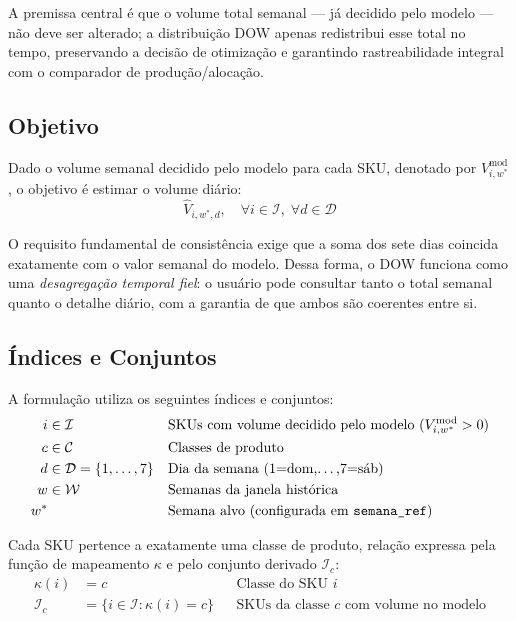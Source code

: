 \documentclass[11pt,a4paper]{article}
\begin{document}
A premissa central é que o volume total semanal --- já decidido pelo modelo ---
não deve ser alterado; a distribuição DOW apenas redistribui esse total no tempo,
preservando a decisão de otimização e garantindo rastreabilidade integral com o
comparador de produção/alocação.

\subsection{Objetivo}

Dado o volume semanal decidido pelo modelo para cada SKU, denotado por
$V^{\text{mod}}_{i,w^*}$, o objetivo é estimar o volume diário:
\begin{equation}\label{eq:dow:objetivo}
\hat{V}_{i,w^*,d}, \quad \forall i \in \mathcal{I},\;\forall d \in \mathcal{D}
\end{equation}

O requisito fundamental de consistência exige que a soma dos sete dias coincida
exatamente com o valor semanal do modelo. Dessa forma, o DOW funciona como uma
\emph{desagregação temporal fiel}: o usuário pode consultar tanto o total semanal
quanto o detalhe diário, com a garantia de que ambos são coerentes entre si.

\subsection{Índices e Conjuntos}

A formulação utiliza os seguintes índices e conjuntos:
\begin{align}\label{eq:dow:indices}
i &\in \mathcal{I} && \text{SKUs com volume decidido pelo modelo ($V^{\text{mod}}_{i,w^*}>0$)} \nonumber\\
c &\in \mathcal{C} && \text{Classes de produto} \nonumber\\
d &\in \mathcal{D}=\{1,\ldots,7\} && \text{Dia da semana (1=dom,\ldots,7=sáb)} \nonumber\\
w &\in \mathcal{W} && \text{Semanas da janela histórica} \nonumber\\
w^* &&& \text{Semana alvo (configurada em \texttt{semana\_ref})}
\end{align}

Cada SKU pertence a exatamente uma classe de produto, relação expressa pela
função de mapeamento $\kappa$ e pelo conjunto derivado $\mathcal{I}_c$:
\begin{align}\label{eq:dow:mapeamentos}
\kappa(i) &= c && \text{Classe do SKU } i \nonumber\\
\mathcal{I}_c &= \{i \in \mathcal{I} : \kappa(i)=c\} && \text{SKUs da classe } c \text{ com volume no modelo}
\end{align}
\end{document}
